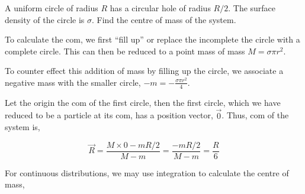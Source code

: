 \begin{example}
    A uniform circle of radius \(R\) has a circular hole of radius \(R/2\). The surface 
    density of the circle is \(\sigma\). Find the centre of mass of the system.
    \begin{soln}
        To calculate the com, we first ``fill up'' or replace the incomplete the circle with 
        a complete circle. This can then be reduced to a point mass of mass \(M = \sigma\pi r^2\).

        To counter effect this addition of mass by filling up the circle, we associate 
        a negative mass with the smaller circle, \(-m = -\frac{\sigma\pi r^2}{4}\).

        Let the origin the com of the first circle, then the first circle, which we have 
        reduced to be a particle at its com, has a position vector, \(\vec{0}\). 
        Thus, com of the system is,

        \begin{equation*}
            \Vec{R} = \frac{M \times 0 -mR/2}{M - m} = \frac{-mR/2}{M-m} = \frac{R}{6}
        \end{equation*}
    \end{soln}
\end{example}   

For continuous distributions, we may use integration to calculate the centre of mass,

